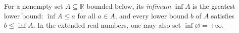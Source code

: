 
For a nonempty set $A\subseteq\mathbb R$ bounded below, its \emph{infimum} $\inf A$ is the greatest lower bound: $\inf A\le a$ for all $a\in A$, and every lower bound $b$ of $A$ satisfies $b\le\inf A$. In the extended real numbers, one may also set $\inf\varnothing=+\infty$.
